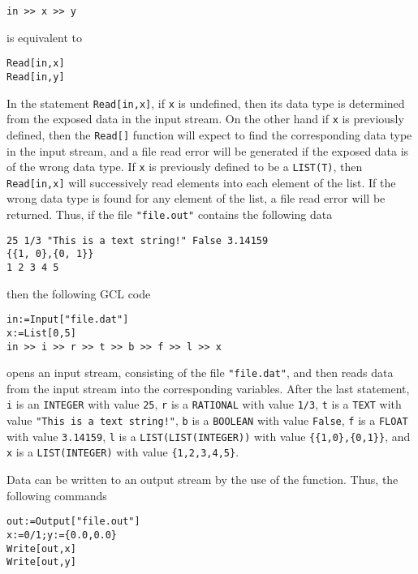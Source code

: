 \begin{verbatim}
in >> x >> y
\end{verbatim}
 
\noindent
is equivalent to 

\begin{verbatim}
Read[in,x]
Read[in,y]
\end{verbatim}

\noindent
In the statement \verb+Read[in,x]+, if \verb+x+ is undefined, then its
data type is determined from the exposed data in the input stream.  On
the other hand if \verb+x+ is previously defined, then the
\verb+Read[]+ function will expect to find the corresponding data type
in the input stream, and a file read error will be generated if the
exposed data is of the wrong data type.  If \verb+x+ is previously
defined to be a \verb+LIST(T)+, then \verb+Read[in,x]+ will
successively read elements into each element of the list.  If the
wrong data type is found for any element of the list, a file read
error will be returned.  Thus, if the file \verb+"file.out"+ contains
the following data

\begin{verbatim}
25 1/3 "This is a text string!" False 3.14159 
{{1, 0},{0, 1}}
1 2 3 4 5
\end{verbatim}

\noindent
then the following GCL code

\begin{verbatim}
in:=Input["file.dat"]
x:=List[0,5]
in >> i >> r >> t >> b >> f >> l >> x
\end{verbatim}

\noindent
opens an input stream, consisting of the file \verb+"file.dat"+, and
then reads data from the input stream into the corresponding
variables.  After the last statement, 
\verb+i+ is an \verb+INTEGER+ with value \verb+25+, 
\verb+r+ is a \verb+RATIONAL+ with value \verb+1/3+, 
\verb+t+ is a \verb+TEXT+ with value \verb+"This is a text string!"+, 
\verb+b+ is a \verb+BOOLEAN+ with value \verb+False+, 
\verb+f+ is a \verb+FLOAT+ with value \verb+3.14159+, 
\verb+l+ is a \verb+LIST(LIST(INTEGER))+ with value \verb+{{1,0},{0,1}}+, and 
\verb+x+ is a \verb+LIST(INTEGER)+ with value \verb+{1,2,3,4,5}+.  

Data can be written to an output stream by the use of the
 function.  Thus, the following commands

\begin{verbatim}
out:=Output["file.out"]
x:=0/1;y:={0.0,0.0}
Write[out,x]
Write[out,y]
\end{verbatim}

